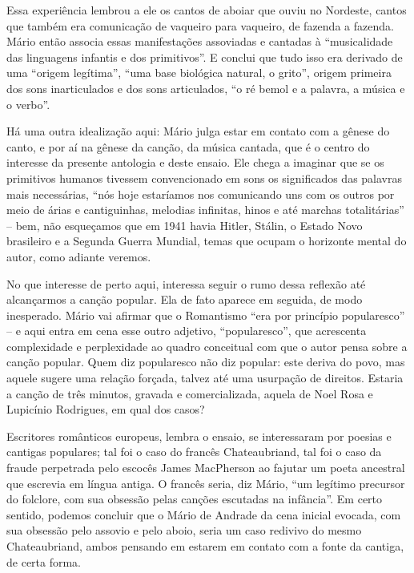 Essa experiência lembrou a ele os cantos de aboiar que ouviu no
Nordeste, cantos que também era comunicação de vaqueiro para vaqueiro,
de fazenda a fazenda. Mário então associa essas manifestações assoviadas
e cantadas à ``musicalidade das linguagens infantis e dos primitivos''.
E conclui que tudo isso era derivado de uma ``origem legítima'', ``uma
base biológica natural, o grito'', origem primeira dos sons
inarticulados e dos sons articulados, ``o ré bemol e a palavra, a música
e o verbo''.

Há uma outra idealização aqui: Mário julga estar em contato com a gênese
do canto, e por aí na gênese da canção, da música cantada, que é o
centro do interesse da presente antologia e deste ensaio. Ele chega a
imaginar que se os primitivos humanos tivessem convencionado em sons os
significados das palavras mais necessárias, ``nós hoje estaríamos nos
comunicando uns com os outros por meio de árias e cantiguinhas, melodias
infinitas, hinos e até marchas totalitárias'' -- bem, não esqueçamos que
em 1941 havia Hitler, Stálin, o Estado Novo brasileiro e a Segunda
Guerra Mundial, temas que ocupam o horizonte mental do autor, como
adiante veremos.

No que interesse de perto aqui, interessa seguir o rumo dessa reflexão
até alcançarmos a canção popular. Ela de fato aparece em seguida, de
modo inesperado. Mário vai afirmar que o Romantismo ``era por princípio
popularesco'' -- e aqui entra em cena esse outro adjetivo,
``popularesco'', que acrescenta complexidade e perplexidade ao quadro
conceitual com que o autor pensa sobre a canção popular. Quem diz
popularesco não diz popular: este deriva do povo, mas aquele sugere uma
relação forçada, talvez até uma usurpação de direitos. Estaria a canção
de três minutos, gravada e comercializada, aquela de Noel Rosa e
Lupicínio Rodrigues, em qual dos casos?

Escritores românticos europeus, lembra o ensaio, se interessaram por
poesias e cantigas populares; tal foi o caso do francês Chateaubriand,
tal foi o caso da fraude perpetrada pelo escocês James MacPherson ao
fajutar um poeta ancestral que escrevia em língua antiga. O francês
seria, diz Mário, ``um legítimo precursor do folclore, com sua obsessão
pelas canções escutadas na infância''. Em certo sentido, podemos
concluir que o Mário de Andrade da cena inicial evocada, com sua
obsessão pelo assovio e pelo aboio, seria um caso redivivo do mesmo
Chateaubriand, ambos pensando em estarem em contato com a fonte da
cantiga, de certa forma.

